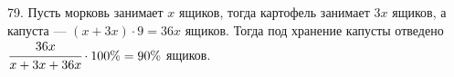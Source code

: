 79. Пусть морковь занимает $x$ ящиков, тогда картофель занимает $3x$ ящиков, а капуста --- $(x+3x)\cdot9=36x$ ящиков. Тогда под хранение капусты отведено $\cfrac{36x}{x+3x+36x}\cdot100\%=90\%$ ящиков.\\
